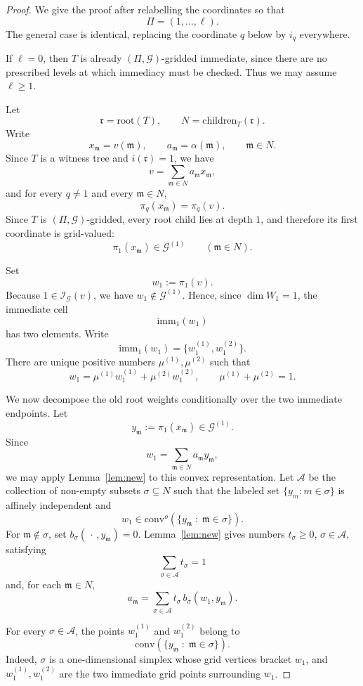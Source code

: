 \documentclass[10pt,a4paper]{amsart}
\providecommand{\cG}[0]{\ensuremath{\mathcal G}\xspace}
\providecommand{\cI}[0]{\ensuremath{\mathcal I}\xspace}
\providecommand{\conv}[1]{\ensuremath{\mathrm{conv}{\left({#1}\right)}\xspace}}
\providecommand{\convo}[1]{\ensuremath{\mathrm{conv}^o{\left({#1}\right)}\xspace}}
\newcommand{\fm}{\mathfrak{m}}
\newcommand{\fr}{\mathfrak{r}}
\let\geq\geqslant
\providecommand{\imm}[0]{\ensuremath{\mathrm{imm}}\xspace}
\let\geq\geqslant
\begin{document}
\begin{proof}
We give the proof after relabelling the coordinates so that
\[
  \Pi=(1,\ldots,\ell).
\]
The general case is identical, replacing the coordinate $q$ below by
$i_q$ everywhere.

If $\ell=0$, then $T$ is already $(\Pi,\cG)$-gridded immediate, since
there are no prescribed levels at which immediacy must be checked.
Thus we may assume $\ell\geq 1$.

Let
\[
  \fr=\mathrm{root}(T), \qquad N=\mathrm{children}_T(\fr).
\]
Write
\[
  x_\fm=v(\fm),\qquad a_\fm=\alpha(\fm),\qquad \fm\in N.
\]
Since $T$ is a witness tree and $i(\fr)=1$, we have
\[
  v=\sum_{\fm\in N} a_\fm x_\fm,
\]
and for every $q\neq 1$ and every $\fm\in N$,
\[
  \pi_q(x_\fm)=\pi_q(v).
\]
Since $T$ is $(\Pi,\cG)$-gridded, every root child lies at
depth $1$, and therefore its first coordinate is grid-valued:
\[
  \pi_1(x_\fm)\in \cG^{(1)}\qquad (\fm\in N).
\]

Set
\[
  w_1:=\pi_1(v).
\]
Because $1\in \cI_{\cG}(v)$, we have $w_1\notin \cG^{(1)}$. Hence, since
$\dim W_1=1$, the immediate cell
\[
  \imm_1(w_1)
\]
has two elements. Write
\[
  \imm_1(w_1)=\{w_1^{(1)},w_1^{(2)}\}.
\]
There are unique positive numbers $\mu^{(1)},\mu^{(2)}$ such that
\[
  w_1=\mu^{(1)} w_1^{(1)}+\mu^{(2)}w_1^{(2)},\qquad
  \mu^{(1)}+\mu^{(2)}=1.
\]

We now decompose the old root weights conditionally over the two
immediate endpoints. Let
\[
  y_\fm:=\pi_1(x_\fm)\in \cG^{(1)}.
\]
Since
\[
  w_1=\sum_{\fm\in N} a_\fm y_\fm,
\]
we may apply Lemma~\ref{lem:new} to this convex representation.  Let
$\mathcal A$ be the collection of non-empty subsets
$\sigma\subseteq N$ such that the labeled set
$\{y_m:m\in\sigma\}$ is affinely independent and
\[
  w_1\in 
  \convo{\{y_\fm \;:\; \fm\in\sigma\}}.
\]
For $\fm\notin\sigma$, set $b_\sigma(\,\cdot\,,y_\fm)=0$.  Lemma~\ref{lem:new}  gives
numbers $t_\sigma\geq 0$, $\sigma\in\mathcal A$, satisfying
\[
  \sum_{\sigma\in\mathcal A}t_\sigma=1
\]
and, for each $\fm\in N$,
\begin{equation}\label{eq:old-weight-decomp}
  a_\fm
  =
  \sum_{\sigma\in\mathcal A}
  t_\sigma\, b_\sigma(w_1,y_\fm).
\end{equation}

For every $\sigma\in\mathcal A$, the points $w_1^{(1)}$ and
$w_1^{(2)}$ belong to
\[
  \conv{\{y_\fm \;:\; \fm\in\sigma\}}.
\]
Indeed, $\sigma$ is a one-dimensional simplex whose grid vertices
bracket $w_1$, and $w_1^{(1)},w_1^{(2)}$ are the two immediate grid
points surrounding $w_1$.


\end{proof}
\end{document}
